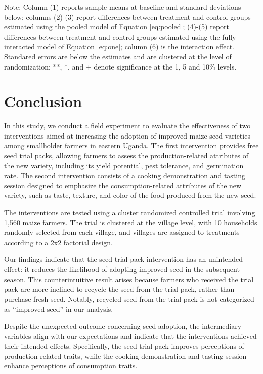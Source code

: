 \documentclass[english]{article}\usepackage[]{graphicx}\usepackage[]{xcolor}
\begin{document}
\begin{sidewaystable}
\begin{center}
\begin{tabular}{rccccccc}
\hline\hline
\end{tabular}
\end{center}
\scriptsize
Note: Column (1) reports sample means at baseline and standard deviations below;  columns (2)-(3) report differences between treatment and control groups estimated using the pooled model of Equation  \ref{eq:pooled}; (4)-(5) report differences between treatment and control groups estimated using the fully interacted model of Equation \ref{eq:one}; column (6) is the interaction effect. Standared errors are below the estimates and are clustered at the level of randomization; **, *, and + denote significance at the 1, 5 and 10\% levels.
\end{sidewaystable}


\section{Conclusion}

In this study, we conduct a field experiment to evaluate the effectiveness
of two interventions aimed at increasing the adoption of improved
maize seed varieties among smallholder farmers in eastern Uganda.
The first intervention provides free seed trial packs, allowing farmers
to assess the production-related attributes of the new variety, including
its yield potential, pest tolerance, and germination rate. The second
intervention consists of a cooking demonstration and tasting session
designed to emphasize the consumption-related attributes of the new
variety, such as taste, texture, and color of the food produced from
the new seed.

The interventions are tested using a cluster randomized controlled
trial involving 1,560 maize farmers. The trial is clustered at the
village level, with 10 households randomly selected from each village,
and villages are assigned to treatments according to a 2x2 factorial
design.

Our findings indicate that the seed trial pack intervention has an
unintended effect: it reduces the likelihood of adopting improved
seed in the subsequent season. This counterintuitive result arises
because farmers who received the trial pack are more inclined to recycle
the seed from the trial pack, rather than purchase fresh seed. Notably,
recycled seed from the trial pack is not categorized as “improved
seed” in our analysis.

Despite the unexpected outcome concerning seed adoption, the intermediary
variables align with our expectations and indicate that the interventions
achieved their intended effects. Specifically, the seed trial pack
improves perceptions of production-related traits, while the cooking
demonstration and tasting session enhance perceptions of consumption
traits.
\end{document}
